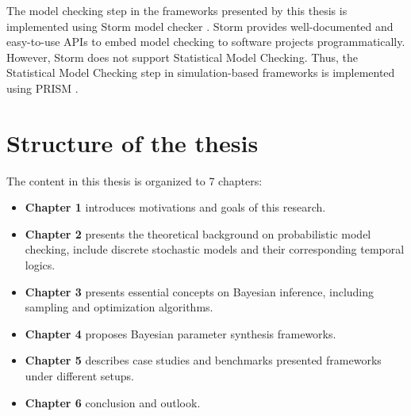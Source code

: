 The model checking step in the frameworks presented by this thesis is implemented using Storm model
checker \cite{hensel2020probabilistic}. Storm provides well-documented and easy-to-use APIs to embed
model checking to software projects programmatically. However, Storm does not support Statistical
Model Checking. Thus, the Statistical Model Checking step in simulation-based frameworks is
implemented using PRISM \cite{kwiatkowska2011prism}.

\section{Structure of the thesis}
The content in this thesis is organized to 7 chapters:
\begin{itemize}
      \item \textbf{Chapter 1} introduces motivations and goals of this research.
      \item \textbf{Chapter 2} presents the theoretical background on probabilistic model checking,
            include discrete stochastic models and their  corresponding temporal logics.
      \item \textbf{Chapter 3} presents essential concepts on Bayesian inference, including sampling
            and optimization algorithms.
      \item \textbf{Chapter 4} proposes Bayesian parameter synthesis frameworks.
      \item \textbf{Chapter 5} describes case studies and benchmarks presented frameworks under
            different setups.
      \item \textbf{Chapter 6} conclusion and outlook.
\end{itemize}

